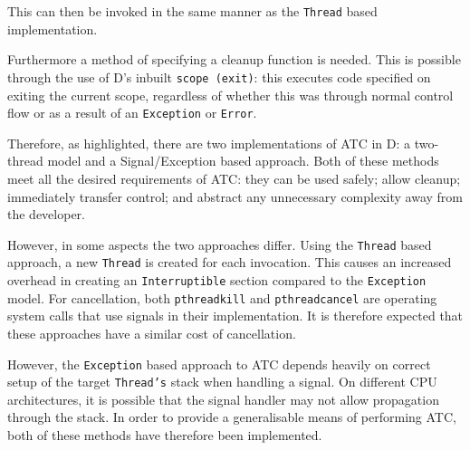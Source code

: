 This can then be invoked in the same manner as the \texttt{Thread} based
implementation.
\par\bigskip\noindent
Furthermore a method of specifying a cleanup function is needed. This
is possible through the use of D's inbuilt \texttt{scope (exit)}:
this executes code specified on exiting the current scope, regardless of
whether this was through normal control flow or as a result of an
\texttt{Exception} or \texttt{Error}. 
\par\bigskip\noindent
Therefore, as highlighted, there are two implementations of ATC in D: a 
two-thread model and a Signal/Exception based
approach. Both of these methods meet all the desired requirements of ATC: 
they can be used safely; allow cleanup; immediately transfer control; and
abstract any unnecessary complexity away from the developer. 
\par\bigskip\noindent
However, in some aspects the two approaches differ. 
Using the \texttt{Thread} based approach, a new \texttt{Thread} is
created for each invocation. This causes an increased overhead in creating an 
\texttt{Interruptible} section compared to the \texttt{Exception} model.
For cancellation, both
\texttt{pthread\textunderscore{}kill} and \texttt{pthread\textunderscore{}cancel}
are operating system calls that use signals in their implementation. It is
therefore expected that these approaches have a similar cost of cancellation.
\par\bigskip\noindent
However, the \texttt{Exception} based approach to ATC depends heavily on correct 
setup of the target \texttt{Thread's} stack when handling a signal. 
On different CPU architectures, it is possible that the signal handler may not 
allow propagation through the stack.
In order to provide a generalisable means of performing ATC, both of
these methods have therefore been implemented. 


